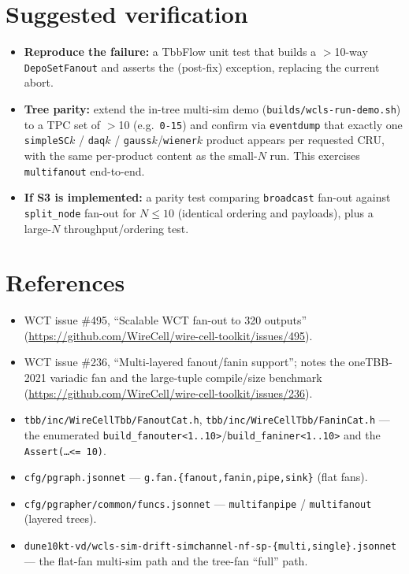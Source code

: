 \documentclass[11pt]{article}
\newcommand{\code}[1]{\texttt{#1}}
\newcommand{\file}[1]{\texttt{\small #1}}
\begin{document}
\section{Suggested verification}

\begin{itemize}
\item \textbf{Reproduce the failure:} a TbbFlow unit test that builds a
  $>$10-way \code{DepoSetFanout} and asserts the (post-fix) exception, replacing
  the current abort.
\item \textbf{Tree parity:} extend the in-tree multi-sim demo
  (\file{builds/wcls-run-demo.sh}) to a TPC set of $>$10 (e.g.\ \code{0-15}) and
  confirm via \code{eventdump} that exactly one \code{simpleSC$k$} /
  \code{daq$k$} / \code{gauss$k$}/\code{wiener$k$} product appears per requested
  CRU, with the same per-product content as the small-$N$ run.  This exercises
  \code{multifanout} end-to-end.
\item \textbf{If S3 is implemented:} a parity test comparing \code{broadcast}
  fan-out against \code{split\_node} fan-out for $N\le 10$ (identical ordering
  and payloads), plus a large-$N$ throughput/ordering test.
\end{itemize}

\section*{References}
\begin{itemize}
\item WCT issue \#495, ``Scalable WCT fan-out to 320 outputs''
  (\url{https://github.com/WireCell/wire-cell-toolkit/issues/495}).
\item WCT issue \#236, ``Multi-layered fanout/fanin support''; notes the
  oneTBB-2021 variadic fan and the large-tuple compile/size benchmark
  (\url{https://github.com/WireCell/wire-cell-toolkit/issues/236}).
\item \file{tbb/inc/WireCellTbb/FanoutCat.h},
  \file{tbb/inc/WireCellTbb/FaninCat.h} --- the enumerated
  \code{build\_fanouter<1..10>}/\code{build\_faniner<1..10>} and the
  \code{Assert(\dots <= 10)}.
\item \file{cfg/pgraph.jsonnet} --- \code{g.fan.\{fanout,fanin,pipe,sink\}}
  (flat fans).
\item \file{cfg/pgrapher/common/funcs.jsonnet} --- \code{multifanpipe} /
  \code{multifanout} (layered trees).
\item \file{dune10kt-vd/wcls-sim-drift-simchannel-nf-sp-\{multi,single\}.jsonnet}
  --- the flat-fan multi-sim path and the tree-fan ``full'' path.
\end{itemize}
\end{document}
